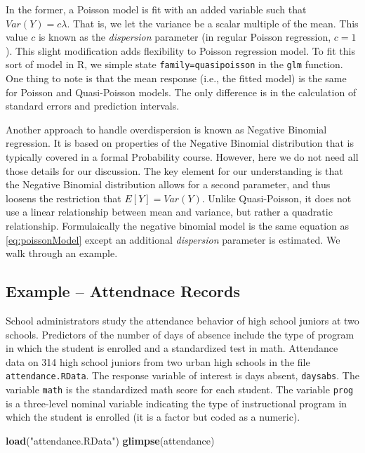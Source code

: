 \documentclass[
]{book}
\newenvironment{Shaded}{\begin{snugshade}}{\end{snugshade}}
\newcommand{\FunctionTok}[1]{\textcolor[rgb]{0.13,0.29,0.53}{\textbf{#1}}}
\newcommand{\NormalTok}[1]{#1}
\newcommand{\StringTok}[1]{\textcolor[rgb]{0.31,0.60,0.02}{#1}}
\begin{document}
In the former, a Poisson model is fit with an added variable such that \(Var(Y) = c \lambda\). That is, we let the variance be a scalar multiple of the mean. This value \(c\) is known as the \emph{dispersion} parameter (in regular Poisson regression, \(c=1\)). This slight modification adds flexibility to Poisson regression model. To fit this sort of model in R, we simple state \texttt{family=quasipoisson} in the \texttt{glm} function. One thing to note is that the mean response (i.e., the fitted model) is the same for Poisson and Quasi-Poisson models. The only difference is in the calculation of standard errors and prediction intervals.

Another approach to handle overdispersion is known as Negative Binomial regression. It is based on properties of the Negative Binomial distribution that is typically covered in a formal Probability course. However, here we do not need all those details for our discussion. The key element for our understanding is that the Negative Binomial distribution allows for a second parameter, and thus loosens the restriction that \(E[Y]=Var(Y)\). Unlike Quasi-Poisson, it does not use a linear relationship between mean and variance, but rather a quadratic relationship. Formulaically the negative binomial model is the same equation as \eqref{eq:poissonModel} except an additional \emph{dispersion} parameter is estimated. We walk through an example.

\hypertarget{example-attendnace-records}{%
\subsection{Example -- Attendnace Records}\label{example-attendnace-records}}

School administrators study the attendance behavior of high school juniors at two schools. Predictors of the number of days of absence include the type of program in which the student is enrolled and a standardized test in math. Attendance data on 314 high school juniors from two urban high schools in the file \texttt{attendance.RData}. The response variable of interest is days absent, \texttt{daysabs}. The variable \texttt{math} is the standardized math score for each student. The variable \texttt{prog} is a three-level nominal variable indicating the type of instructional program in which the student is enrolled (it is a factor but coded as a numeric).

\begin{Shaded}
\begin{Highlighting}[]
\FunctionTok{load}\NormalTok{(}\StringTok{"attendance.RData"}\NormalTok{)}
\FunctionTok{glimpse}\NormalTok{(attendance)}
\end{Highlighting}
\end{Shaded}
\end{document}

